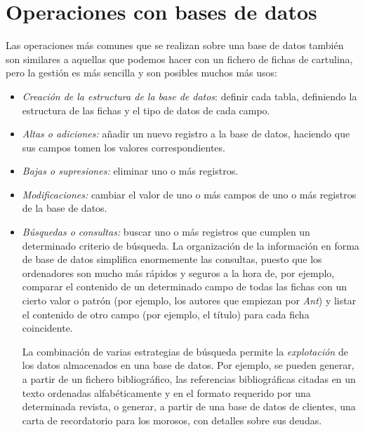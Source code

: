 \section{Operaciones con bases de datos} 

Las operaciones más comunes que se realizan sobre una base de datos también son similares a aquellas que podemos hacer con un fichero de fichas de cartulina, pero la gestión es más sencilla y son posibles muchos más usos: \begin{itemize} \item \emph{Creación de la estructura de la base de datos}: definir cada tabla, definiendo la estructura de las fichas y el tipo de datos de cada campo. \item \emph{Altas o adiciones:} añadir un nuevo registro a la base de datos, haciendo que sus campos tomen los valores correspondientes. \item \emph{Bajas o supresiones:} eliminar uno o más registros. \item \emph{Modificaciones:} cambiar el valor de uno o más campos de uno o más registros de la base de datos. \item \emph{Búsquedas o consultas:} buscar uno o más registros que cumplen un determinado criterio de búsqueda. La organización de la información en forma de base de datos simplifica enormemente las consultas, puesto que los ordenadores son mucho más rápidos y seguros a la hora de, por ejemplo, comparar el contenido de un determinado campo de todas las fichas con un cierto valor o patrón (por ejemplo, los autores que empiezan por \emph{Ant}) y listar el contenido de otro campo (por ejemplo, el título) para cada ficha coincidente. 

La combinación de varias estrategias de búsqueda permite la \emph{explotación} de los datos almacenados en una base de datos. Por ejemplo, se pueden generar, a partir de un fichero bibliográfico, las referencias bibliográficas citadas en un texto ordenadas alfabéticamente y en el formato requerido por una determinada revista, o generar, a partir de una base de datos de clientes, una carta de recordatorio para los morosos, con detalles sobre sus deudas. 


\end{itemize}
